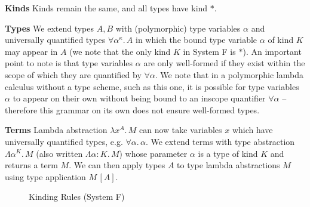 \documentclass[acmsmall, 9pt]{article}
\begin{document}
\noindent
\textbf{Kinds} Kinds remain the same, and all types have kind $*$.

\noindent
\textbf{Types} We extend types $A, B$ with (polymorphic) type variables $\alpha$ and universally quantified types $\forall \alpha^{\kappa}. \, A$ in which the bound type variable $\alpha$ of kind $K$ may appear in $A$ (we note that the only kind $K$ in System F is $*$). An important point to note is that type variables $\alpha$ are only well-formed if they exist within the scope of which they are quantified by $\forall \alpha$. We note that in a polymorphic lambda calculus without a type scheme, such as this one, it is possible for type variables $\alpha$ to appear on their own without being bound to an inscope quantifier $\forall \alpha$ -- therefore this grammar on its own does not ensure well-formed types.

\noindent
\textbf{Terms} Lambda abstraction $\lambda x^A . \, M$ can now take variables $x$ which have universally quantified types, e.g. $\forall \alpha. \, \alpha$. We extend terms with type abstraction $\Lambda \alpha^K . \, M$ (also written $\Lambda \alpha : K . \, M$) whose parameter $\alpha$ is a type of kind $K$ and returns a term $M$. We can then apply types $A$ to type lambda abstractions $M$ using type application $M \, [A]$.

\begin{figure}[H]
\flushleft {}
\caption{Kinding Rules (System F)}
\end{figure}
\end{document}
